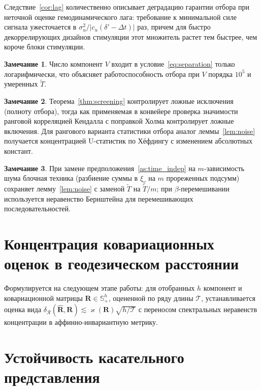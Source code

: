 \documentclass[12pt]{article}
\theoremstyle{plain}
\theoremstyle{definition}
\newtheorem{remark}{Замечание}
\begin{document}
Следствие~\ref{cor:lag} количественно описывает деградацию гарантии отбора при неточной оценке гемодинамического лага: требование к минимальной силе сигнала ужесточается в $\sigma_u^2 / |c_u(\delta' - \Delta t)|$ раз, причем для быстро декоррелирующих дизайнов стимуляции этот множитель растет тем быстрее, чем короче блоки стимуляции.

\begin{remark}
Число компонент $V$ входит в условие~\eqref{eq:separation} только логарифмически, что объясняет работоспособность отбора при $V$ порядка $10^5$ и умеренных $\widetilde{T}$.
\end{remark}

\begin{remark}
Теорема~\ref{thm:screening} контролирует ложные исключения (полноту отбора), тогда как применяемая в конвейере проверка значимости ранговой корреляцией Кендалла с поправкой Холма контролирует ложные включения. Для рангового варианта статистики отбора аналог леммы~\ref{lem:noise} получается концентрацией U-статистик по Хёфдингу с изменением абсолютных констант.
\end{remark}

\begin{remark}\label{rem:mixing}
При замене предположения~\ref{as:time_indep} на $m$-зависимость шума блочная техника (разбиение суммы в $\xi_v$ на $m$ прореженных подсумм) сохраняет лемму~\ref{lem:noise} с заменой $\widetilde{T}$ на $\widetilde{T}/m$; при $\beta$-перемешивании используется неравенство Бернштейна для перемешивающих последовательностей.
\end{remark}

\section{Концентрация ковариационных оценок в геодезическом расстоянии}

Формулируется на следующем этапе работы: для отобранных $h$ компонент и ковариационной матрицы $\mathbf{R} \in \mathbb{S}_{+}^{h}$, оцененной по ряду длины $\mathcal{T}$, устанавливается оценка вида $\delta_{\mathcal{R}}(\widehat{\mathbf{R}}, \mathbf{R}) \lesssim \varkappa(\mathbf{R}) \sqrt{h/\mathcal{T}}$ с переносом спектральных неравенств концентрации в аффинно-инвариантную метрику.

\section{Устойчивость касательного представления}
\end{document}
